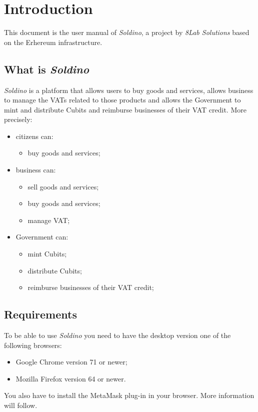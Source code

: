 \section{Introduction} 
	This document is the user manual of \textit{Soldino}, a project by 
	\textit{8Lab Solutions} based on the Erhereum infrastructure. 
	\subsection{What is \textit{Soldino}}
	\textit{Soldino} is a platform that allows 
	users to buy goods and services, allows business to manage the VATs 
	related to those products and allows the Government to mint and distribute
	Cubits and reimburse businesses of their VAT credit.
	More precisely:
	\begin{itemize}
		\item citizens can:
		\begin{itemize}
			\item  buy goods and services;
		\end{itemize}
		\item business can:
		\begin{itemize}
			\item sell goods and services;
			\item buy goods and services;
			\item manage VAT;
		\end{itemize}
		\item Government can:
		\begin{itemize}
			\item mint Cubits;
			\item distribute Cubits;
			\item reimburse businesses of their VAT credit;
		\end{itemize}
	\end{itemize}

\subsection{Requirements}
	To be able to use \textit{Soldino} you need to have the desktop version 
	one of the following browsers:
	\begin{itemize}
		\item Google Chrome version 71 or newer;
		\item Mozilla Firefox version 64 or newer.
	\end{itemize}
	You also have to install the MetaMask plug-in in your browser. More 
	information will follow. 